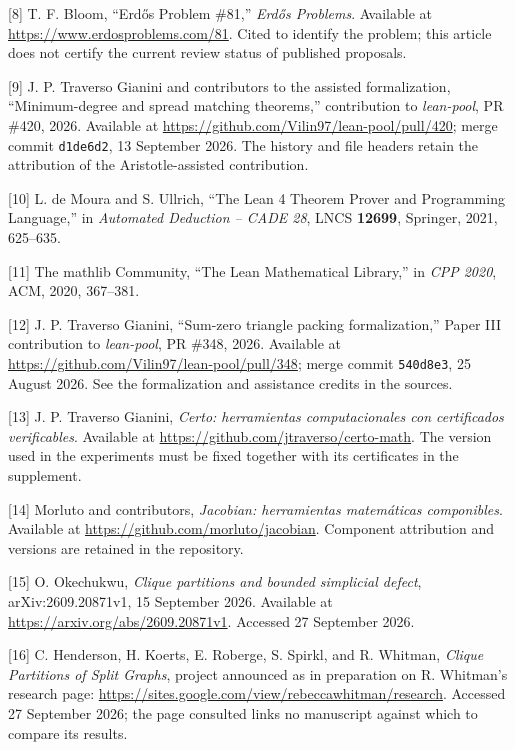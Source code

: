 \documentclass[english,11pt,a4paper]{article}
\begin{document}
{[}8{]} T. F. Bloom, ``Erdős Problem \#81,'' \emph{Erdős Problems}.
Available at \url{https://www.erdosproblems.com/81}. Cited to identify
the problem; this article does not certify the current review status of
published proposals.

{[}9{]} J. P. Traverso Gianini and contributors to the assisted
formalization, ``Minimum-degree and spread matching theorems,''
contribution to \emph{lean-pool}, PR \#420, 2026. Available at
\url{https://github.com/Vilin97/lean-pool/pull/420}; merge commit
\nolinkurl{d1de6d2}, 13 September 2026. The history and file headers retain
the attribution of the Aristotle-assisted contribution.

{[}10{]} L. de Moura and S. Ullrich, ``The Lean 4 Theorem Prover and
Programming Language,'' in \emph{Automated Deduction -- CADE 28}, LNCS
\textbf{12699}, Springer, 2021, 625--635.

{[}11{]} The mathlib Community, ``The Lean Mathematical Library,'' in
\emph{CPP 2020}, ACM, 2020, 367--381.

{[}12{]} J. P. Traverso Gianini, ``Sum-zero triangle packing
formalization,'' Paper III contribution to \emph{lean-pool}, PR \#348,
2026. Available at \url{https://github.com/Vilin97/lean-pool/pull/348};
merge commit \nolinkurl{540d8e3}, 25 August 2026. See the formalization and
assistance credits in the sources.

{[}13{]} J. P. Traverso Gianini, \emph{Certo: herramientas
computacionales con certificados verificables}. Available at
\url{https://github.com/jtraverso/certo-math}. The version used in the
experiments must be fixed together with its certificates in the
supplement.

{[}14{]} Morluto and contributors, \emph{Jacobian: herramientas
matemáticas componibles}. Available at
\url{https://github.com/morluto/jacobian}. Component attribution and
versions are retained in the repository.

{[}15{]} O. Okechukwu, \emph{Clique partitions and bounded simplicial
defect}, arXiv:2609.20871v1, 15 September 2026. Available at
\url{https://arxiv.org/abs/2609.20871v1}. Accessed 27 September 2026.

{[}16{]} C. Henderson, H. Koerts, E. Roberge, S. Spirkl, and R. Whitman,
\emph{Clique Partitions of Split Graphs}, project announced as in
preparation on R. Whitman's research page:
\url{https://sites.google.com/view/rebeccawhitman/research}. Accessed 27
September 2026; the page consulted links no manuscript against which to
compare its results.
\end{document}
